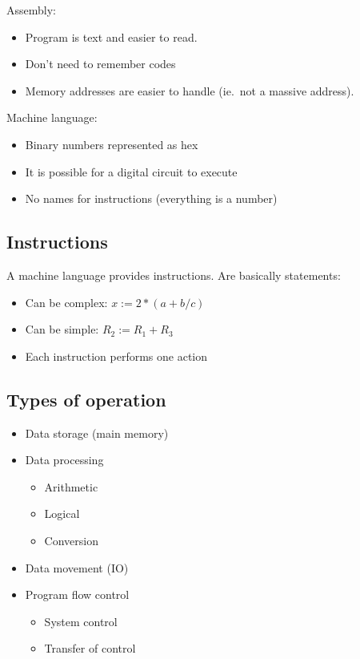 Assembly:
\begin{itemize}
    \item Program is text and easier to read.
    \item Don't need to remember codes
    \item Memory addresses are easier to handle (ie.\ not a massive address).
\end{itemize}
%
Machine language:
\begin{itemize}
    \item Binary numbers represented as hex
    \item It is possible for a digital circuit to execute
    \item No names for instructions (everything is a number)
\end{itemize}

\subsection{Instructions}\label{sub:instructions}

A machine language provides instructions.
Are basically statements:
\begin{itemize}
    \item Can be complex: \(x:=2*(a+b/c)\)
    \item Can be simple: \(R_2:=R_1 + R_3\)
    \item Each instruction performs one action
\end{itemize}

\subsection{Types of operation}\label{sub:types_of_operation}

\begin{itemize}
    \item Data storage (main memory)
    \item Data processing
          \begin{itemize}
              \item Arithmetic
              \item Logical
              \item Conversion
          \end{itemize}
    \item Data movement (IO)
    \item Program flow control
          \begin{itemize}
              \item System control
              \item Transfer of control
          \end{itemize}
\end{itemize}

